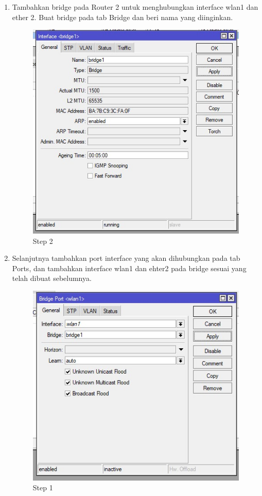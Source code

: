 \begin{enumerate}
	\item Tambahkan bridge pada Router 2 untuk menghubungkan interface wlan1 dan ether 2. Buat
	bridge pada tab Bridge dan beri nama yang diinginkan.
	\begin{figure}[H]
		\centering
		\includegraphics[width=0.5\linewidth]{P1/img/per3pc2step4.jpg}
		\caption{Step 2}
		\label{fig:gambar25}
	\end{figure}

	\item Selanjutnya tambahkan port interface yang akan dihubungkan pada tab Ports, dan tambahkan
	interface wlan1 dan ehter2 pada bridge sesuai yang telah dibuat sebelumnya.
	\begin{figure}[H]
		\centering
		\includegraphics[width=0.5\linewidth]{P1/img/per3pc2step5.jpg}
		\caption{Step 1}
		\label{fig:gambar26}
	\end{figure}


\end{enumerate}
